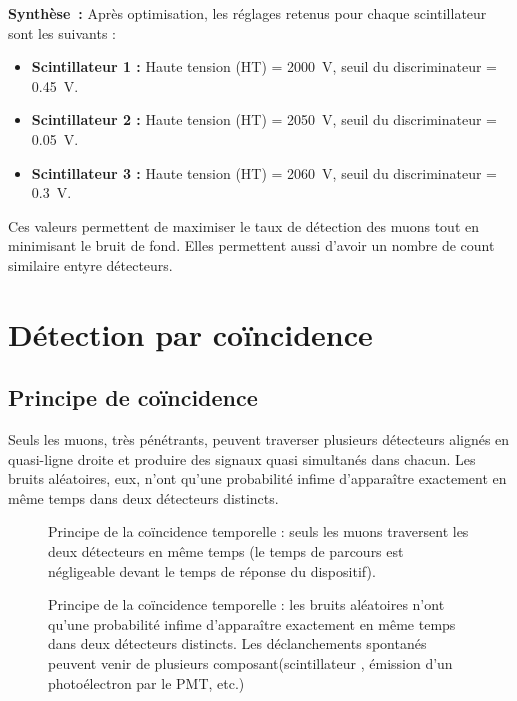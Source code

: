 \documentclass[a4paper,12pt,twoside]{article}
\begin{document}

\begin{remarque}
\textbf{Synthèse~:} Après optimisation, les réglages retenus pour chaque scintillateur sont les suivants :
\begin{itemize}
    \item \textbf{Scintillateur 1 :} Haute tension (HT) = 2000~V, seuil du discriminateur = 0.45~V.
    \item \textbf{Scintillateur 2 :} Haute tension (HT) = 2050~V, seuil du discriminateur = 0.05~V.
    \item \textbf{Scintillateur 3 :} Haute tension (HT) = 2060~V, seuil du discriminateur = 0.3~V.
\end{itemize}
Ces valeurs permettent de maximiser le taux de détection des muons tout en minimisant le bruit de fond. Elles permettent aussi d'avoir un nombre de count similaire entyre détecteurs.
\end{remarque}

\newpage

\section{Détection par coïncidence}

\subsection{Principe de coïncidence}



\begin{center}
\begin{tcolorbox}[colback=blue!5!white, colframe=blue!60!black, title=Principe de la coïncidence]
Seuls les muons, très pénétrants, peuvent traverser plusieurs détecteurs alignés en quasi-ligne droite et produire des signaux quasi simultanés dans chacun. Les bruits aléatoires, eux, n’ont qu’une probabilité infime d’apparaître exactement en même temps dans deux détecteurs distincts.
\end{tcolorbox}
\end{center}

\begin{figure}[H]
  \begin{minipage}
    [t]{0.45\textwidth}
    \centering
    
    \caption{Principe de la coïncidence temporelle : seuls les muons traversent les deux détecteurs en même temps (le temps de parcours est négligeable devant le temps de réponse du dispositif).}
    \label{fig:coincidence_principle}
  \end{minipage}
  \hfill
  \begin{minipage}
    [t]{0.45\textwidth}
    \centering
    
    \caption{Principe de la coïncidence temporelle : les bruits aléatoires n’ont qu’une probabilité infime d’apparaître exactement en même temps dans deux détecteurs distincts. Les déclanchements spontanés peuvent venir de plusieurs composant(scintillateur , émission d'un photoélectron par le PMT, etc.)}
    \label{fig:coincidence_principle2}
  \end{minipage}
\end{figure}
\end{document}
